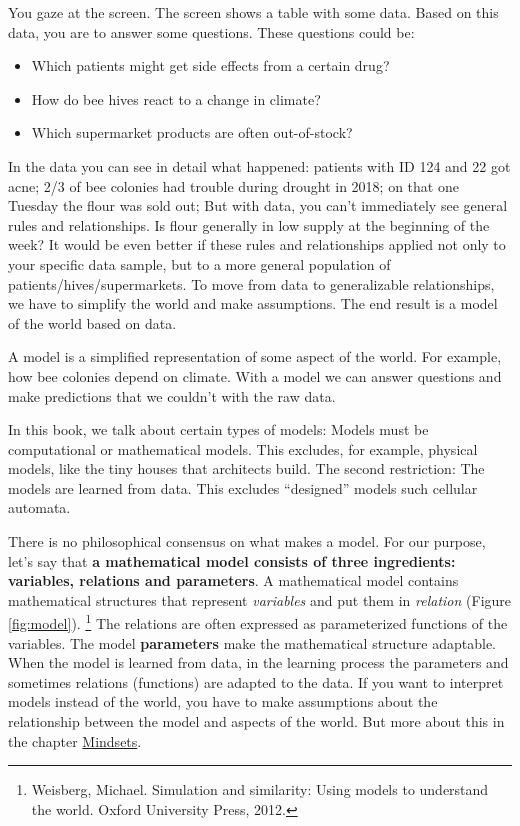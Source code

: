 \documentclass[
  10pt,
]{scrbook}
\providecommand{\tightlist}{%
  \setlength{\itemsep}{0pt}\setlength{\parskip}{0pt}}
\begin{document}
You gaze at the screen.
The screen shows a table with some data.
Based on this data, you are to answer some questions.
These questions could be:

\begin{itemize}
\tightlist
\item
  Which patients might get side effects from a certain drug?
\item
  How do bee hives react to a change in climate?
\item
  Which supermarket products are often out-of-stock?
\end{itemize}

In the data you can see in detail what happened: patients with ID 124 and 22 got acne; 2/3 of bee colonies had trouble during drought in 2018; on that one Tuesday the flour was sold out;
But with data, you can't immediately see general rules and relationships.
Is flour generally in low supply at the beginning of the week?
It would be even better if these rules and relationships applied not only to your specific data sample, but to a more general population of patients/hives/supermarkets.
To move from data to generalizable relationships, we have to simplify the world and make assumptions.
The end result is a model of the world based on data.

A model is a simplified representation of some aspect of the world.
For example, how bee colonies depend on climate.
With a model we can answer questions and make predictions that we couldn't with the raw data.

In this book, we talk about certain types of models:
Models must be computational or mathematical models.
This excludes, for example, physical models, like the tiny houses that architects build.
The second restriction: The models are learned from data.
This excludes ``designed'' models such cellular automata.

There is no philosophical consensus on what makes a model.
For our purpose, let's say that \textbf{a mathematical model consists of three ingredients: variables, relations and parameters}.
A mathematical model contains mathematical structures that represent \emph{variables} and put them in \emph{relation} (Figure \ref{fig:model}). \footnote{Weisberg, Michael. Simulation and similarity: Using models to understand the world. Oxford University Press, 2012.}
The relations are often expressed as parameterized functions of the variables.
The model \textbf{parameters} make the mathematical structure adaptable.
When the model is learned from data, in the learning process the parameters and sometimes relations (functions) are adapted to the data.
If you want to interpret models instead of the world, you have to make assumptions about the relationship between the model and aspects of the world.
But more about this in the chapter \protect\hyperlink{mindsets}{Mindsets}.
\end{document}
